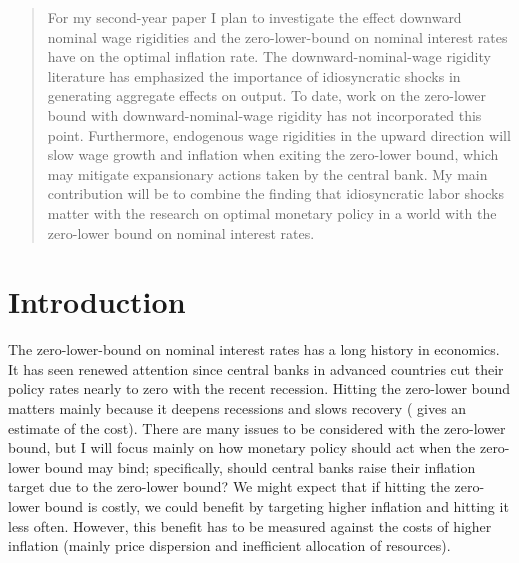 \documentclass[12pt,a4paper]{article}            %
\begin{document}



\begin{abstract}
For my second-year paper I plan to investigate the effect downward nominal wage rigidities and the zero-lower-bound on nominal interest rates have on the optimal inflation rate.
The downward-nominal-wage rigidity literature has emphasized the importance of idiosyncratic shocks in generating aggregate effects on output.
To date, work on the zero-lower bound with downward-nominal-wage rigidity has not incorporated this point.
Furthermore, endogenous wage rigidities in the upward direction will slow wage growth and inflation when exiting the zero-lower bound, which may mitigate expansionary actions taken by the central bank.
My main contribution will be to combine the finding that idiosyncratic labor shocks matter with the research on optimal monetary policy in a world with the zero-lower bound on nominal interest rates.
\end{abstract}
\newpage
\section{Introduction}
\label{sec:introduction}

The zero-lower-bound on nominal interest rates has a long history in economics. It has seen renewed attention since central banks in advanced countries cut their policy rates nearly to zero with the recent recession.
Hitting the zero-lower bound matters mainly because it deepens recessions and slows recovery (\cite{williams_2009} gives an estimate of the cost).
There are many issues to be considered with the zero-lower bound, but I will focus mainly on how monetary policy should act when the zero-lower bound may bind;
specifically, should central banks raise their inflation target due to the zero-lower bound?
We might expect that if hitting the zero-lower bound is costly, we could benefit by targeting higher inflation and hitting it less often.
However, this benefit has to be measured against the costs of higher inflation (mainly price dispersion and inefficient allocation of resources).
\end{document}
